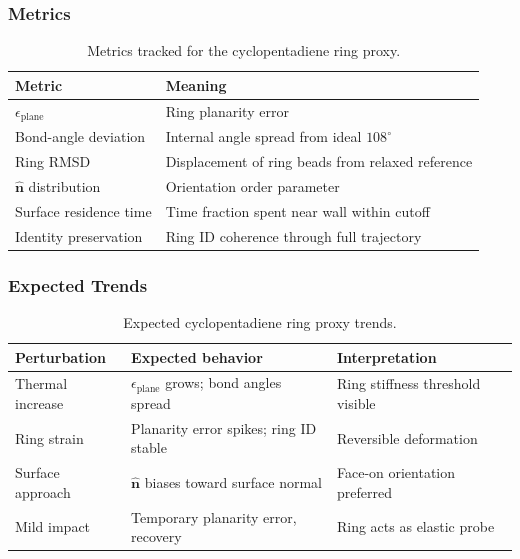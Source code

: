 \documentclass[12pt]{article}
\begin{document}
\subsubsection*{Metrics}

\begin{table}[H]
\centering
\caption{Metrics tracked for the cyclopentadiene ring proxy.}
\label{tab:cpd_metrics}
\begin{tabular}{ll}
\toprule
\textbf{Metric} & \textbf{Meaning} \\
\midrule
$\epsilon_{\mathrm{plane}}$ & Ring planarity error \\
Bond-angle deviation        & Internal angle spread from ideal $108^\circ$ \\
Ring RMSD                   & Displacement of ring beads from relaxed reference \\
$\hat{\mathbf{n}}$ distribution & Orientation order parameter \\
Surface residence time      & Time fraction spent near wall within cutoff \\
Identity preservation       & Ring ID coherence through full trajectory \\
\bottomrule
\end{tabular}
\end{table}

\subsubsection*{Expected Trends}

\begin{table}[H]
\centering
\caption{Expected cyclopentadiene ring proxy trends.}
\label{tab:cpd_trends}
\begin{tabular}{p{}p{}p{}}
\toprule
\textbf{Perturbation} & \textbf{Expected behavior} & \textbf{Interpretation} \\
\midrule
Thermal increase   & $\epsilon_{\mathrm{plane}}$ grows; bond angles spread & Ring stiffness threshold visible \\
Ring strain        & Planarity error spikes; ring ID stable             & Reversible deformation \\
Surface approach   & $\hat{\mathbf{n}}$ biases toward surface normal     & Face-on orientation preferred \\
Mild impact        & Temporary planarity error, recovery                & Ring acts as elastic probe \\
\bottomrule
\end{tabular}
\end{table}
\end{document}
